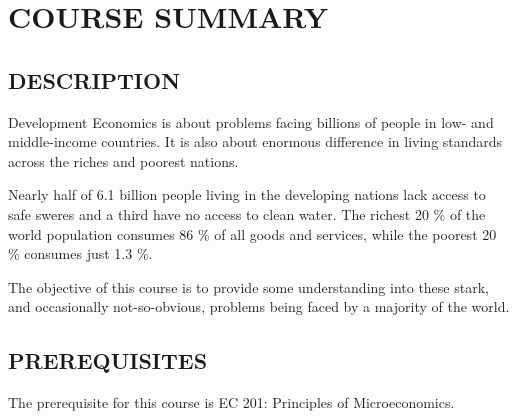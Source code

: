 \documentclass[11pt]{article}
\begin{document}
\selectfont



\bigskip

\section*{COURSE SUMMARY}

\begin{center}
    \end{center}

\subsection*{DESCRIPTION}
Development Economics is about problems facing billions of people in low- and middle-income countries.
It is also about enormous difference in living standards across the riches and poorest nations. 

Nearly half of 6.1 billion people living in the developing nations lack access to safe sweres and a third have no access to clean water. 
The richest 20 \% of the world population consumes 86 \% of all goods and services, while the poorest 20 \% consumes just 1.3 \%. 

The objective of this course is to provide some understanding into these stark, and occasionally not-so-obvious, problems being faced by a majority of the world. 

\subsection*{PREREQUISITES}
The prerequisite for this course is EC 201: Principles of Microeconomics. 
\end{document}

